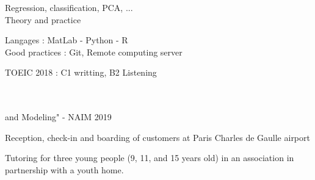 


Regression, classification, PCA, ... \\
Theory and practice\\
\vspace{0.2cm}

Langages : MatLab - Python  - R\\
Good practices : Git, Remote computing server


\vspace{0.1cm}
TOEIC 2018 : C1 writting, B2 Listening


\vspace{0.5cm}

 \\
 \\ \hspace{0.5cm} and Modeling" - NAIM 2019
    




   Reception, check-in and boarding of customers at Paris Charles de Gaulle airport

\divider

Tutoring for three young people (9, 11, and 15 years old) in an association in
partnership with a youth home.

\divider

